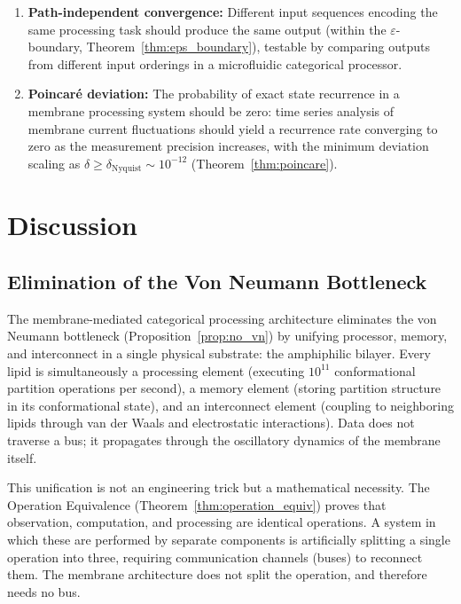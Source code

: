 \documentclass[twocolumn,10pt]{article}
\theoremstyle{remark}
\newcommand{\eps}{\varepsilon}
\begin{document}
\begin{enumerate}
\item \textbf{Path-independent convergence:} Different input sequences encoding the same processing task should produce the same output (within the $\eps$-boundary, Theorem~\ref{thm:eps_boundary}), testable by comparing outputs from different input orderings in a microfluidic categorical processor.

\item \textbf{Poincar\'e deviation:} The probability of exact state recurrence in a membrane processing system should be zero: time series analysis of membrane current fluctuations should yield a recurrence rate converging to zero as the measurement precision increases, with the minimum deviation scaling as $\delta \geq \delta_{\mathrm{Nyquist}} \sim 10^{-12}$ (Theorem~\ref{thm:poincare}).
\end{enumerate}

\section{Discussion}
\label{sec:discussion}

\subsection{Elimination of the Von Neumann Bottleneck}

The membrane-mediated categorical processing architecture eliminates the von Neumann bottleneck (Proposition~\ref{prop:no_vn}) by unifying processor, memory, and interconnect in a single physical substrate: the amphiphilic bilayer. Every lipid is simultaneously a processing element (executing $10^{11}$ conformational partition operations per second), a memory element (storing partition structure in its conformational state), and an interconnect element (coupling to neighboring lipids through van der Waals and electrostatic interactions). Data does not traverse a bus; it propagates through the oscillatory dynamics of the membrane itself.

This unification is not an engineering trick but a mathematical necessity. The Operation Equivalence (Theorem~\ref{thm:operation_equiv}) proves that observation, computation, and processing are identical operations. A system in which these are performed by separate components is artificially splitting a single operation into three, requiring communication channels (buses) to reconnect them. The membrane architecture does not split the operation, and therefore needs no bus.
\end{document}
